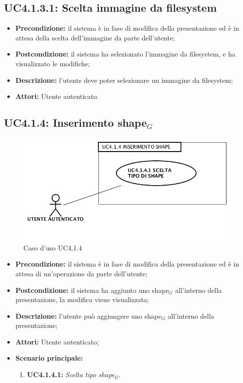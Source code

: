 \subsection{ UC4.1.3.1: Scelta immagine da filesystem}

\begin{itemize}
	\item \textbf{Precondizione:} il sistema è in fase di modifica della presentazione ed è in attesa della scelta dell'immagine da parte dell'utente;
	\item \textbf{Postcondizione:} il sistema ha selezionato l'immagine da filesystem, e ha visualizzato le modifiche;
	\item \textbf{Descrizione:} l'utente deve poter selezionare un immagine da filesystem;
	\item \textbf{Attori:} Utente autenticato.
\end{itemize}
\subsection{ UC4.1.4: Inserimento shape$_G$}

\begin{figure}[h]
	\begin{center}
	\includegraphics[scale=0.4]{diagram/UC4-1-4.png}
	\caption{Caso d'uso UC4.1.4}
	\end{center}
\end{figure}
\begin{itemize}
	\item \textbf{Precondizione:} il sistema è in fase di modifica della presentazione ed è in attesa di un'operazione da parte dell'utente;
	\item \textbf{Postcondizione:} il sistema ha aggiunto uno shape$_G$ all'interno della presentazione, la modifica viene visualizzata;
	\item \textbf{Descrizione:} l'utente può aggiungere uno shape$_G$ all'interno della presentazione;
	\item \textbf{Attori:} Utente autenticato;
	\item \textbf{Scenario principale:}
	\begin{enumerate}
		\item \textbf{ UC4.1.4.1:} \textit{ Scelta tipo shape$_G$}.
	\end{enumerate}
\end{itemize}
